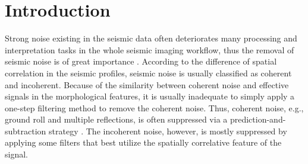 \DeclareRobustCommand{\dlo}[1]{}
\DeclareRobustCommand{\wen}[1]{#1}

\section{Introduction}
Strong noise existing in the seismic data often deteriorates many processing and interpretation tasks in the whole seismic imaging workflow, thus the removal of \dlo{the }seismic noise is of great importance \cite[]{liuyang20091,guochang2012,shuwei2016,wangchong2018,zhaoqiang2018}.  According to the difference of spatial correlation in the seismic profiles, seismic noise is usually classified as coherent and incoherent\dlo{ noise}.  Because of the similarity between coherent noise and effective signals in the morphological features, it is usually inadequate to simply apply a one-step filtering method to remove the coherent noise.  Thus, coherent noise, e.g., \dlo{the }ground roll and multiple reflections, is often suppressed via a prediction-and-subtraction strategy \wen{\cite[]{verschuure1991,verschuur1992,karsli2004using,halliday2007,dondurur2012swell,karsli2018mean,zhangdong2020ortho}}. The incoherent noise, however, is mostly suppressed by applying some filters that best utilize the spatially correlative feature of the \dlo{noise}\wen{signal}. %

